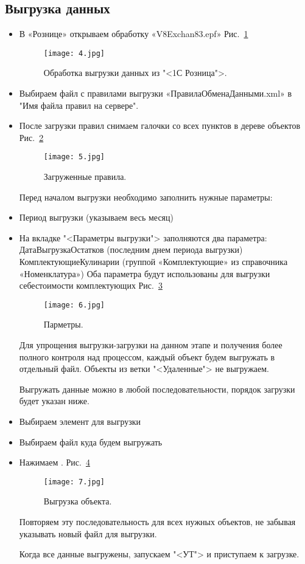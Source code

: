 \subsection{Выгрузка данных}
\begin{itemize}	
	\item В «Рознице» открываем обработку «V8Exchan83.epf»
	Рис.~\ref{ris:4.jpg}	
	\begin{figure}[H]
		\texttt{[image: 4.jpg]}
		\caption{Обработка выгрузки данных из "<1С Розница">.}
		\label{ris:4.jpg}
	\end{figure}
	
	\item	Выбираем файл с правилами выгрузки «ПравилаОбменаДанными.xml» в "Имя файла правил на сервере".
	\item После загрузки правил снимаем галочки со всех пунктов в дереве объектов
	Рис.~\ref{ris:5.jpg}	
	\begin{figure}[H]
		\texttt{[image: 5.jpg]}
					\caption{Загруженные правила.}
		\label{ris:5.jpg}
	\end{figure}
Перед началом выгрузки необходимо заполнить нужные параметры:
\item Период выгрузки (указываем весь месяц)
\item На вкладке "<Параметры выгрузки"> заполняются два параметра:
\subitem ДатаВыгрузкаОстатков (последним днем периода выгрузки) 
\subitem КомплектующиеКулинарии (группой «Комплектующие» из справочника «Номенклатура»)
Оба параметра будут использованы для выгрузки себестоимости комплектующих
	Рис.~\ref{ris:6.jpg}
	\begin{figure}[H]
		\texttt{[image: 6.jpg]}
		\caption{Парметры.}
		\label{ris:6.jpg}
	\end{figure}
Для упрощения выгрузки-загрузки на данном этапе и получения более полного контроля над процессом, каждый объект будем выгружать в отдельный файл. Объекты из ветки "<Удаленные"> не выгружаем.\par Выгружать данные можно в любой последовательности, порядок загрузки будет указан ниже. 
\item Выбираем элемент для выгрузки
\item Выбираем файл куда будем выгружать
\item Нажимаем .
	Рис.~\ref{ris:7.jpg}
	\begin{figure}[H]
		\texttt{[image: 7.jpg]}
		\caption{Выгрузка объекта.}
		\label{ris:7.jpg}
	\end{figure}
Повторяем эту последовательность для всех нужных объектов, не забывая указывать новый файл для выгрузки. \par
Когда все данные выгружены, запускаем "<УТ"> и приступаем к загрузке.

\end{itemize}
